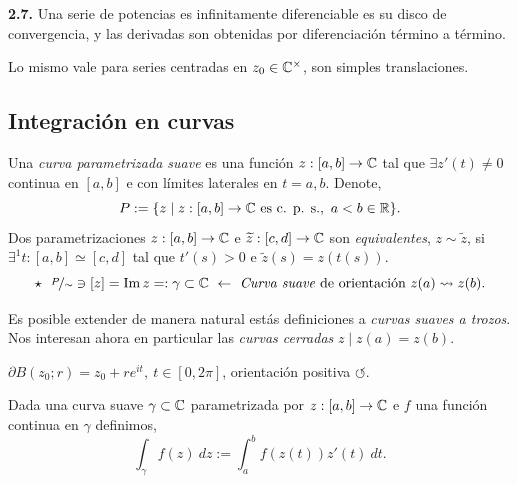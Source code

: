 
\begin{corollary}
    \textbf{2.7.} Una serie de potencias es infinitamente diferenciable es su disco de convergencia, y las derivadas son obtenidas por diferenciación término a término. 
\end{corollary}

\begin{note}
    Lo mismo vale para series centradas en \(z_0 \in \mathbb{C}^\times\), son simples translaciones. 
\end{note}

\subsection*{Integración en curvas}

\begin{definition}
    Una \emph{curva parametrizada suave} es una función \(z: [a,b] \to \mathbb{C} \) tal que \(\exists z'(t)\neq 0\) continua en \([a,b]\) e con límites laterales en \(t = a,b\). Denote, 
    \[P :=\{z \mid z:[a,b] \to \mathbb{C} \text{ es c. p. s.}, \ a<b \in \mathbb{R}\}.\]  
    Dos parametrizaciones \(z: [a,b] \to \mathbb{C}\) e \(\widetilde{z}:[c,d] \to \mathbb{C}\) son \emph{equivalentes}, \(z \sim \widetilde{z}\), si \(\exists ^1t :[a,b] \simeq [c,d]\) tal que \(t'(s)>0\) e \( \widetilde{z}(s) = z(t(s))\). 
    \[\star \ \ \nicefrac{P}{\sim} \ni [z] = \operatorname{Im}z =: \gamma \subset \mathbb{C} \ \leftarrow \text{ \emph{Curva suave} de orientación }z(a) \leadsto z(b).\]
\end{definition}

\begin{note}
    Es posible extender de manera natural estás definiciones a \emph{curvas suaves a trozos}. Nos interesan ahora en particular las \emph{curvas cerradas} \(z \mid z(a) = z(b)\).
\end{note}

\begin{example}
    \(\partial B(z_0; r) = z_0 + r e^{it}, \ t\in [0, 2\pi]\), orientación positiva \(\circlearrowleft\). 
\end{example}

\begin{definition}
    Dada una curva suave \(\gamma \subset \mathbb{C}\) parametrizada por \(z:[a,b] \to \mathbb{C}\) e \(f\) una función continua en \(\gamma\) definimos, 
    \[\int_\gamma f(z) \ dz := \int_a^b f(z(t))z'(t) \ dt.\]
\end{definition}

